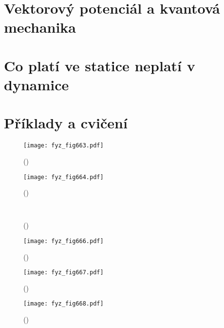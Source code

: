   \section{Vektorový potenciál a kvantová mechanika}\label{fyz:IIchapXVsecV}
  \section{Co platí ve statice neplatí v dynamice}\label{fyz:IIchapXVsecVI}
  \section{Příklady a cvičení}\label{fyz:IIchapXVsecVII}

    \begin{figure}[ht!] %
      \centering
      \texttt{[image: fyz\_fig663.pdf]}
      \caption{
               (\cite[s.~707]{Feynman02})}
      \label{fyz:fig663}
    \end{figure}

    \begin{figure}[ht!] %
      \centering
      \texttt{[image: fyz\_fig664.pdf]}
      \caption{
               (\cite[s.~707]{Feynman02})}
      \label{fyz:fig664}
    \end{figure}

    \begin{figure}[ht!]
      \centering
                     \\
      \label{fyz:fig665}
      \caption{
               (\cite[s.~748]{Feynman02})}
    \end{figure}

    \begin{figure}[ht!] %
      \centering
      \texttt{[image: fyz\_fig666.pdf]}
      \caption{
               (\cite[s.~707]{Feynman02})}
      \label{fyz:fig666}
    \end{figure}

    \begin{figure}[ht!] %
      \centering
      \texttt{[image: fyz\_fig667.pdf]}
      \caption{
               (\cite[s.~707]{Feynman02})}
      \label{fyz:fig667}
    \end{figure}


    \begin{figure}[ht!] %
      \centering
      \texttt{[image: fyz\_fig668.pdf]}
      \caption{
               (\cite[s.~707]{Feynman02})}
      \label{fyz:fig668}
    \end{figure}

